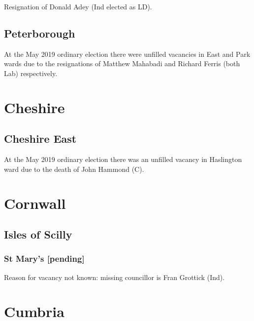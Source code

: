 \documentclass[a4paper,openany]{book}
\begin{document}
\begin{resultsiii}

Resignation of Donald Adey (Ind elected as LD).

\subsection*{Peterborough}

At the May 2019 ordinary election there were unfilled vacancies in East and Park wards due to the resignations of Matthew Mahabadi and Richard Ferris (both Lab) respectively.

\section{Cheshire}

\subsection*{Cheshire East}

At the May 2019 ordinary election there was an unfilled vacancy in Haslington ward due to the death of John Hammond (C).

\section{Cornwall}

\subsection*{Isles of Scilly}

\subsubsection*{St Mary's \hspace*{\fill}\nolinebreak[1]%
	\enspace\hspace*{\fill}
	[pending]}


Reason for vacancy not known: missing councillor is Fran Grottick (Ind).

\section{Cumbria}


\end{resultsiii}
\end{document}
